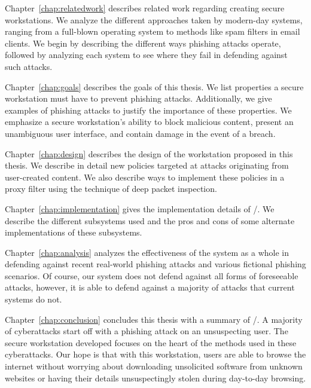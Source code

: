 Chapter~\ref{chap:relatedwork} describes related work regarding creating secure workstations. We analyze the different approaches taken by modern-day systems, ranging from a full-blown operating system to methods like spam filters in email clients. We begin by describing the different ways phishing attacks operate, followed by analyzing each system to see where they fail in defending against such attacks.

Chapter~\ref{chap:goals} describes the goals of this thesis. We list properties a secure workstation must have to prevent phishing attacks. Additionally, we give examples of phishing attacks to justify the importance of these properties. We emphasize a secure workstation's ability to block malicious content, present an unambiguous user interface, and contain damage in the event of a breach.

Chapter~\ref{chap:design} describes the design of the workstation proposed in this thesis. We describe in detail new policies targeted at attacks originating from user-created content. We also describe ways to implement these policies in a proxy filter using the technique of deep packet inspection.

Chapter~\ref{chap:implementation} gives the implementation details of \namesecureworkstation/. We describe the different subsystems used and the pros and cons of some alternate implementations of these subsystems.

Chapter~\ref{chap:analysis} analyzes the effectiveness of the system as a whole in defending against recent real-world phishing attacks and various fictional phishing scenarios. Of course, our system does not defend against all forms of foreseeable attacks, however, it is able to defend against a majority of attacks that current systems do not.

Chapter~\ref{chap:conclusion} concludes this thesis with a summary of \namesecureworkstation/. A majority of cyberattacks start off with a phishing attack on an unsuspecting user. The secure workstation developed focuses on the heart of the methods used in these cyberattacks. Our hope is that with this workstation, users are able to browse the internet without worrying about downloading unsolicited software from unknown websites or having their details unsuspectingly stolen during day-to-day browsing.